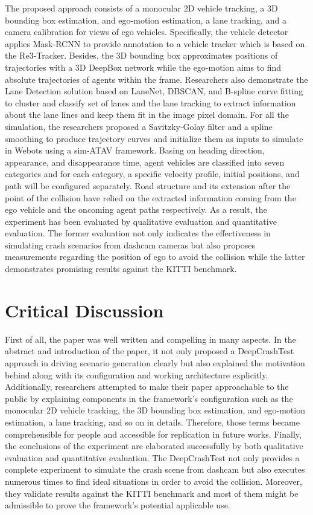 \documentclass[10pt,a4paper]{report}
\begin{document}
The proposed approach consists of a monocular 2D vehicle tracking, a 3D bounding box estimation, and ego-motion estimation, a lane tracking, and a camera calibration for views of ego vehicles.
%
Specifically, the vehicle detector applies Mask-RCNN to provide annotation to a vehicle tracker which is based on the Re3-Tracker. 
%
Besides, the 3D bounding box approximates positions of trajectories with a 3D DeepBox network while the ego-motion aims to find absolute trajectories of agents within the frame.
%
Researchers also demonstrate the Lane Detection solution based on LaneNet, DBSCAN, and B-spline curve fitting to cluster and classify set of lanes and the lane tracking to extract information about the lane lines and keep them fit in the image pixel domain.
%
For all the simulation, the researchers proposed a Savitzky-Golay filter and a spline smoothing to produce trajectory curves and initialize them as inputs to simulate in Webots using a sim-ATAV framework.
%
Basing on heading direction, appearance, and disappearance time, agent vehicles are classified into seven categories and for each category, a specific velocity profile, initial positions, and path will be configured separately.
%
Road structure and its extension after the point of the collision have relied on the extracted information coming from the ego vehicle and the oncoming agent paths respectively.
%
As a result, the experiment has been evaluated by qualitative evaluation and quantitative evaluation.
%
The former evaluation not only indicates the effectiveness in simulating crash scenarios from dashcam cameras but also proposes measurements regarding the position of ego to avoid the collision
%
while the latter demonstrates promising results against the KITTI benchmark.

\section{Critical Discussion}
First of all, the paper was well written and compelling in many aspects. In the abstract and introduction of the paper, it not only proposed a DeepCrashTest approach in driving scenario generation clearly but also explained the motivation behind along with its configuration and working architecture explicitly.
%
Additionally, researchers attempted to make their paper approachable to the public by explaining components in the framework's configuration such as the monocular 2D vehicle tracking, the 3D bounding box estimation, and ego-motion estimation, a lane tracking, and so on in details.
%
Therefore, those terms became comprehensible for people and accessible for replication in future works.
%
Finally, the conclusions of the experiment are elaborated successfully by both qualitative evaluation and quantitative evaluation. 
%
The DeepCrashTest not only provides a complete experiment to simulate the crash scene from dashcam but also executes numerous times to find ideal situations in order to avoid the collision.
%
Moreover, they validate results against the KITTI benchmark and most of them might be admissible to prove the framework's potential applicable use.
%
\end{document}
